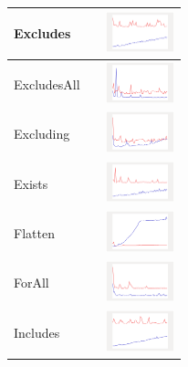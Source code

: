 \begin{longtable}{ m{2.5cm} m{8cm} m{2cm} }
Excludes &

&
\includegraphics[width=2cm]{../graphs/bag/small/Excludes}
\\\hline

ExcludesAll &

&
\includegraphics[width=2cm]{../graphs/bag/small/ExcludesAll}
\\\hline

Excluding &

&
\includegraphics[width=2cm]{../graphs/bag/small/Excluding}
\\\hline

Exists &

&
\includegraphics[width=2cm]{../graphs/bag/small/Exists}
\\\hline

Flatten &

&
\includegraphics[width=2cm]{../graphs/bag/small/Flatten}
\\\hline

ForAll &

&
\includegraphics[width=2cm]{../graphs/bag/small/forALL}
\\\hline

Includes &

&
\includegraphics[width=2cm]{../graphs/bag/small/Includes}
\\\hline


\end{longtable}
